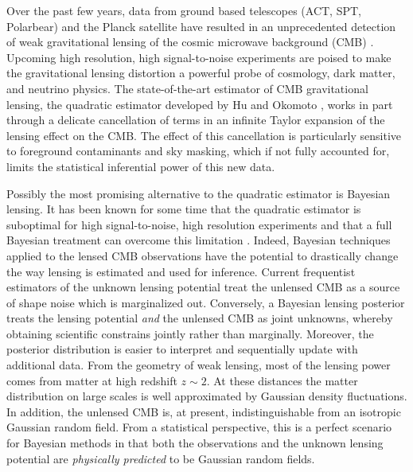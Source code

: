 \documentclass[iop,revtex4,apj,onecolumn]{emulateapj}
\begin{document}
 Over the past few years, data from ground based telescopes (ACT, SPT, Polarbear) and the Planck satellite have resulted in an unprecedented detection of weak gravitational lensing of the cosmic microwave background (CMB) \citep{das2011detection,van2012measurement,planck2013lensing,Polarbear2014,planck2015lensing}.  Upcoming high resolution, high signal-to-noise experiments are poised to    make the gravitational lensing distortion  a  powerful probe of cosmology, dark matter, and neutrino physics. The state-of-the-art estimator of CMB gravitational lensing, the quadratic estimator developed by Hu and Okomoto \citep{hu2001mapping,hu2002mass}, works in part through a delicate cancellation of terms in an infinite Taylor expansion of the lensing effect on the CMB. The effect of this cancellation is particularly sensitive to foreground contaminants and sky masking, which  if not fully accounted for,  limits  the statistical inferential power of this new data.  

 Possibly the most promising alternative to the quadratic estimator is Bayesian lensing. It has been known for some time that the quadratic estimator is suboptimal for high signal-to-noise, high resolution experiments and that a full Bayesian treatment can overcome this limitation
 \citep{HirataSeljak1, HirataSeljak2}. Indeed, Bayesian techniques applied to the lensed CMB observations have the potential to drastically change the way lensing is estimated and used for inference.  Current frequentist estimators of the unknown lensing potential treat the unlensed CMB as a source of shape noise which is marginalized out. Conversely, a Bayesian lensing posterior treats the lensing potential {\em and} the unlensed CMB as joint unknowns, whereby obtaining scientific constrains jointly rather than marginally. Moreover, the  posterior distribution is easier to interpret and sequentially update with additional data. From the geometry of weak lensing, most of the lensing power comes from matter at high redshift $z\sim 2$. At these distances the matter distribution on large scales is well approximated by Gaussian density fluctuations. In addition, the unlensed CMB is, at present, indistinguishable from an isotropic Gaussian random field.  From a statistical perspective, this is a perfect scenario for Bayesian methods in that both the observations and the unknown lensing potential are {\em physically predicted} to be Gaussian random fields.
 
\end{document}

